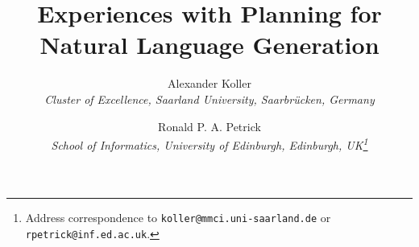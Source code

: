 \documentclass[useAMS,usenatbib]{coin}
\title{Experiences with Planning for Natural Language Generation}
\author{{\sc Alexander Koller}\\
        {\it Cluster of Excellence, Saarland University, Saarbr\"ucken, Germany}\\ 
		\and
        {\sc Ronald P. A. Petrick}\\
        {\it School of Informatics, University of Edinburgh,
          Edinburgh, UK\thanks{Address correspondence to
          \texttt{koller@mmci.uni-saarland.de} or
          \texttt{rpetrick@inf.ed.ac.uk}.}}
}
\date{}
\begin{document}


\maketitle











\pagebreak
\listoffigures
\end{document}
